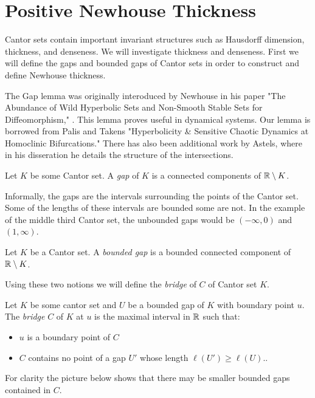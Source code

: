 \section{Positive Newhouse Thickness}
Cantor sets contain important invariant structures such as Hausdorff dimension, thickness, and denseness.  We will investigate thickness and denseness.  First we will define the gaps and bounded gaps of Cantor sets in order to construct and define Newhouse thickness. 

The Gap lemma was originally interoduced by Newhouse in his paper "The Abundance of Wild Hyperbolic Sets and Non-Smooth Stable Sets for Diffeomorphism," \cite{Newhouse}.  This lemma proves useful in dynamical systems.  Our lemma is borrowed from Palis and Takens "Hyperbolicity \& Sensitive Chaotic Dynamics at Homoclinic Bifurcations."  There has also been additional work by Astels, where in his disseration \cite{Astels} he details the structure of the intersections.  
\begin{definition}[Gap]
    Let $K$ be some Cantor set.  A \textit{gap} of $K$ is a connected components of $\mathbb{R} \setminus K$.      
\end{definition}  Informally, the gaps are the intervals surrounding the points of the Cantor set.  Some of the lengths of these intervals are bounded some are not.  In the example of the middle third Cantor set, the unbounded gaps would be $(-\infty, 0)$ and $(1, \infty)$.  

\begin{definition}
    Let $K$ be a Cantor set.  A \textit{bounded gap} is a bounded connected component of $\mathbb{R} \setminus K$.      
\end{definition}

Using these two notions we will define the \textit{bridge} of $C$ of Cantor set $K$.  
\begin{definition}[Bridge]\cite{palis&takens}
    Let $K$ be some cantor set and $U$ be a bounded gap of $K$ with boundary point $u$.  The \textit{bridge} $C$ of $K$ at $u$ is the maximal interval in $\mathbb{R}$ such that:
    \begin{itemize}
        \item $u$ is a boundary point of $C$
        \item $C$ contains no point of a gap $U'$ whose length $\ell(U') \geq \ell(U)$..
    \end{itemize}
\end{definition}

For clarity the picture below shows that there may be smaller bounded gaps contained in $C$.  

